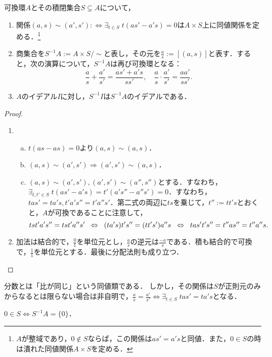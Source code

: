 \documentclass[uplatex,dvipdfmx]{jsreport}
\begin{document}
\begin{definition}[localization]
    可換環$A$とその積閉集合$S\subsetneq A$について，
    \begin{enumerate}
        \item 関係$(a,s)\sim(a',s'):\Leftrightarrow \exists_{t\in S}\;t(as'-a's)=0$は$A\times S$上に同値関係を定める．\footnote{$A$が整域であり，$0\notin S$ならば，この関係は$as'=a's$と同値．また，$0\in S$の時は潰れた同値関係$A\times S$を定める．}
        \item 商集合を$S^{-1}A:=A\times S/\sim$と表し，その元を$\frac{a}{s}:=[(a,s)]$と表す．すると，次の演算について，$S^{-1}A$は再び可換環となる：\[\frac{a}{s}+\frac{a'}{s'}=\frac{as'+a's}{ss'},\quad\frac{a}{s}\cdot\frac{a'}{s'}=\frac{aa'}{ss'}.\]
        \item $A$のイデアル$I$に対し，$S^{-1}I$は$S^{-1}A$のイデアルである．
    \end{enumerate}
\end{definition}
\begin{proof}\mbox{}
    \begin{enumerate}
        \item \begin{enumerate}[(a)]
            \item $t(as-as)=0$より$(a,s)\sim(a,s)$．
            \item $(a,s)\sim(a',s')\Rightarrow(a',s')\sim(a,s)$．
            \item $(a,s)\sim(a',s'),(a',s')\sim(a'',s'')$とする．すなわち，$\exists_{t,t'\in S}\;t(as'-a's)=t'(a's''-a''s')=0$．すなわち，$tas'=ta's,t'a's''=t'a''s'$．第二式の両辺に$ts$を乗じて，$t'':=tt's$とおくと，$A$が可換であることに注意して，
            \[tst'a's''=tst'a''s'\;\;\Leftrightarrow\;\; (ta's)t's''=(tt's')a''s\;\;\Leftrightarrow\;\; tas't's''=t''as''=t''a''s.\]
        \end{enumerate}
        \item 加法は結合的で，$\frac{0}{1}$を単位元とし，$\frac{a}{s}$の逆元は$\frac{-a}{s}$である．積も結合的で可換で，$\frac{1}{1}$を単位元とする．最後に分配法則も成り立つ．
    \end{enumerate}
\end{proof}
\begin{remarks}
    分数とは「比が同じ」という同値類である．
    しかし，その関係は$S$が正則元のみからなるとは限らない場合は非自明で，$\frac{a}{s}=\frac{a'}{s'}\Leftrightarrow\exists_{t\in S}\;tas'=ta's$となる．
\end{remarks}
\begin{remark}
    $0\in S\Leftrightarrow S^{-1}A=\{0\}$．
\end{remark}
\end{document}
